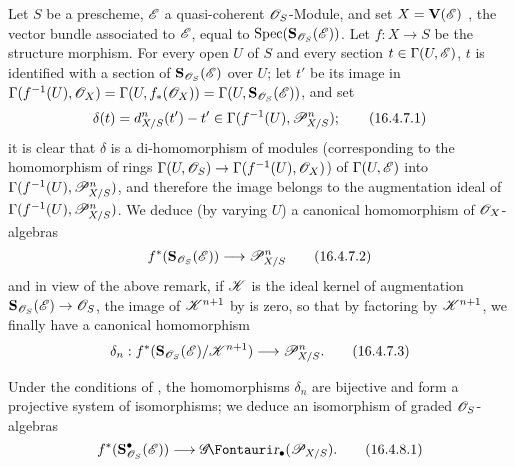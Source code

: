 \begin{env}[16.4.7]
\label{IV.16.4.7}
Let $S$ be a prescheme, $\mathscr{E}$ a quasi-coherent $\mathscr{O}_S$-Module, and set $X = \mathbf{V}(\mathscr{E})$ , the vector bundle associated to $\mathscr{E}$, equal to $\operatorname{Spec}(\mathbf{S}_{\mathscr{O}_S}(\mathscr{E}))$.
Let $f:X \to S$ be the structure morphism.
For every open $U$ of $S$ and every section $t \in \Gamma(U, \mathscr{E})$, $t$ is identified with a section of $\mathbf{S}_{\mathscr{O}_S}(\mathscr{E})$ over $U$;
let $t'$ be its image in $\Gamma(f^{-1}(U), \mathscr{O}_X) = \Gamma(U, f_*(\mathscr{O}_X)) = \Gamma(U, \mathbf{S}_{\mathscr{O}_S}(\mathscr{E}))$, and set
\[
  \label{IV.16.4.7.1}
  \delta(t) = d_{X/S}^n(t') - t' \in \Gamma(f^{-1}(U), \mathscr{P}_{X/S}^n);
  \tag{16.4.7.1}
\]
it is clear that $\delta$ is a di-homomorphism of modules (corresponding to the homomorphism of rings $\Gamma(U, \sh{O}_S) \to \Gamma(f^{-1}(U), \sh{O}_X)$) of $\Gamma(U, \mathscr{E})$ into $\Gamma(f^{-1}(U), \mathscr{P}_{X/S}^n)$, and therefore the image belongs to the augmentation ideal of $\Gamma(f^{-1}(U), \mathscr{P}_{X/S}^n)$.
We deduce (by varying $U$) a canonical homomorphism of $\mathscr{O}_X$-algebras
\[
  \label{IV.16.4.7.2}
  f^*(\bb{S}_{\sh{O}_S}(\sh{E})) \to \sh{P}_{X/S}^n
  \tag{16.4.7.2}
\]
and in view of the above remark, if $\mathscr{K}$ is the ideal kernel of augmentation $\bb{S}_{\sh{O}_S}(\sh{E}) \to \sh{O}_S$, the image of $\mathscr{K}^{n+1}$ by  is zero, so that by factoring by $\mathscr{K}^{n+1}$, we finally have a canonical homomorphism
\[
  \label{IV.16.4.7.3}
  \delta_n: f^*(\bb{S}_{\sh{O}_S}(\sh{E})/\sh{K}^{n+1}) \to \sh{P}_{X/S}^n.
  \tag{16.4.7.3}
\]
\end{env} 

\begin{proposition}[16.4.8]
\label{IV.16.4.8}
Under the conditions of , the homomorphisms $\delta_n$ are bijective and form a projective system of isomorphisms;
we deduce an isomorphism of graded $\mathscr{O}_S$-algebras 
\[
  \label{IV.16.4.8.1}
  f^*(\bb{S}_{\sh{O}_S}^\bullet(\sh{E})) \to \shGr_\bullet(\sh{P}_{X/S}).
  \tag{16.4.8.1}
\]
\end{proposition}

